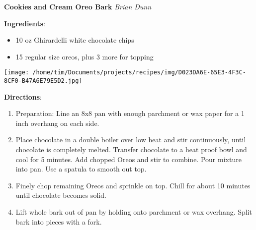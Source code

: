 \documentclass[11pt, twoside, openany]{book}
\begin{document}
\noindent\begin{minipage}[t]{\linewidth}%
{\Large\textbf{Cookies and Cream Oreo Bark}} \label{cookies-and-cream-oreo-bark}\hfill\textit{Brian Dunn}\\
\noindent\begin{minipage}[t]{0.78\linewidth}%
\textbf{Ingredients}:\vspace{-3mm}
\begin{multicols}{2}
\begin{itemize}\setlength\itemsep{-1mm}
\item 10 oz Ghirardelli white chocolate chips
\item 15 regular size oreos, plus 3 more for topping
\end{itemize}
\end{multicols}
\end{minipage}
\noindent\begin{minipage}[t]{0.18\linewidth}
\centering \strut\vspace*{-\baselineskip}\newline
\texttt{[image: /home/tim/Documents/projects/recipes/img/D023DA6E-65E3-4F3C-8CF0-B47A6E79E5D2.jpg]}\\
\end{minipage}\vspace{3mm}
\textbf{Directions}:
\vspace{-3mm}\begin{enumerate}\setlength\itemsep{-1mm}
\item Preparation: Line an 8x8 pan with enough parchment or wax paper for a 1 inch overhang on each side.
\item Place chocolate in a double boiler over low heat and stir continuously, until chocolate is completely melted. Transfer chocolate to a heat proof bowl and cool for 5 minutes. Add chopped Oreos and stir to combine. Pour mixture into pan. Use a spatula to smooth out top.
\item Finely chop remaining Oreos and sprinkle on top. Chill for about 10 minutes until chocolate becomes solid.
\item Lift whole bark out of pan by holding onto parchment or wax overhang. Split bark into pieces with a fork.
\end{enumerate}
\end{minipage}\vspace{8mm}
\end{document}
